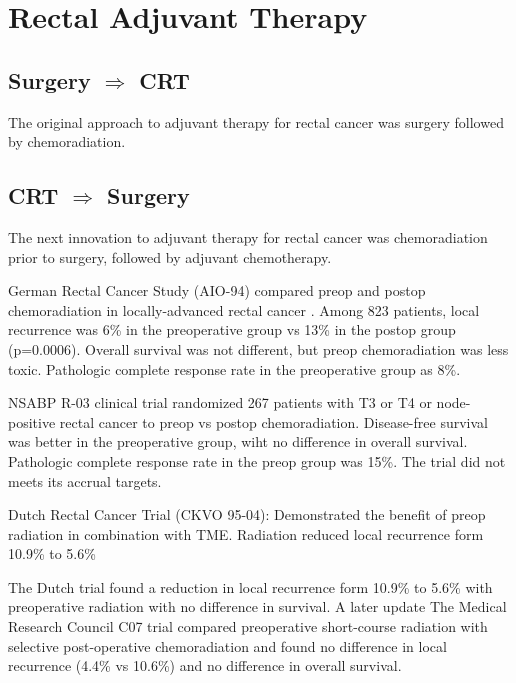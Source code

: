 \documentclass[
]{book}
\begin{document}
\hypertarget{rectal-adjuvant-therapy}{%
\chapter{Rectal Adjuvant Therapy}\label{rectal-adjuvant-therapy}}

\hypertarget{surgery-rightarrow-crt}{%
\section{\texorpdfstring{Surgery \(\Rightarrow\) CRT}{Surgery \textbackslash Rightarrow CRT}}\label{surgery-rightarrow-crt}}

The original approach to adjuvant therapy for rectal cancer was surgery followed by chemoradiation.

\hypertarget{crt-rightarrow-surgery}{%
\section{\texorpdfstring{CRT \(\Rightarrow\) Surgery}{CRT \textbackslash Rightarrow Surgery}}\label{crt-rightarrow-surgery}}

The next innovation to adjuvant therapy for rectal cancer was chemoradiation prior to surgery, followed by adjuvant chemotherapy.

German Rectal Cancer Study (AIO-94) compared preop and postop chemoradiation in locally-advanced rectal cancer \citep{sauer173}. Among 823 patients, local recurrence was 6\% in the preoperative group vs 13\% in the postop group (p=0.0006). Overall survival was not different, but preop chemoradiation was less toxic. Pathologic complete response rate in the preoperative group as 8\%.

NSABP R-03 clinical trial \citep{roh5124} randomized 267 patients with T3 or T4 or node-positive rectal cancer to preop vs postop chemoradiation. Disease-free survival was better in the preoperative group, wiht no difference in overall survival. Pathologic complete response rate in the preop group was 15\%. The trial did not meets its accrual targets.

Dutch Rectal Cancer Trial (CKVO 95-04): Demonstrated the benefit of preop radiation in combination with TME\citep{kapiteijn638}. Radiation reduced local recurrence form 10.9\% to 5.6\%

The Dutch trial found a reduction in local recurrence form 10.9\% to 5.6\% with preoperative radiation with no difference in survival\citep{kapiteijn638}. A later update\citep{vangijn575} The Medical Research Council C07 trial compared preoperative short-course radiation with selective post-operative chemoradiation and found no difference in local recurrence (4.4\% vs 10.6\%) and no difference in overall survival.\citep{sebag-montefiore811}
\end{document}
